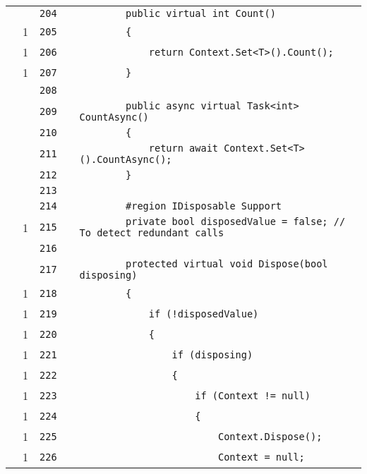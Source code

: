 \documentclass[a4paper,10pt]{article}
\begin{document}
\begin{longtable}[l]{lrrll}
\cellcolor{gray} &  & \verb~204~ & & \verb~        public virtual int Count()~\\
\cellcolor{green} & 1 & \verb~205~ & & \verb~        {~\\
\cellcolor{green} & 1 & \verb~206~ & & \verb~            return Context.Set<T>().Count();~\\
\cellcolor{green} & 1 & \verb~207~ & & \verb~        }~\\
\cellcolor{gray} &  & \verb~208~ & & \verb~~\\
\cellcolor{gray} &  & \verb~209~ & & \verb~        public async virtual Task<int> CountAsync()~\\
\cellcolor{gray} &  & \verb~210~ & & \verb~        {~\\
\cellcolor{gray} &  & \verb~211~ & & \verb~            return await Context.Set<T>().CountAsync();~\\
\cellcolor{gray} &  & \verb~212~ & & \verb~        }~\\
\cellcolor{gray} &  & \verb~213~ & & \verb~~\\
\cellcolor{gray} &  & \verb~214~ & & \verb~        #region IDisposable Support~\\
\cellcolor{green} & 1 & \verb~215~ & & \verb~        private bool disposedValue = false; // To detect redundant calls~\\
\cellcolor{gray} &  & \verb~216~ & & \verb~~\\
\cellcolor{gray} &  & \verb~217~ & & \verb~        protected virtual void Dispose(bool disposing)~\\
\cellcolor{green} & 1 & \verb~218~ & & \verb~        {~\\
\cellcolor{green} & 1 & \verb~219~ & & \verb~            if (!disposedValue)~\\
\cellcolor{green} & 1 & \verb~220~ & & \verb~            {~\\
\cellcolor{green} & 1 & \verb~221~ & & \verb~                if (disposing)~\\
\cellcolor{green} & 1 & \verb~222~ & & \verb~                {~\\
\cellcolor{green} & 1 & \verb~223~ & & \verb~                    if (Context != null)~\\
\cellcolor{green} & 1 & \verb~224~ & & \verb~                    {~\\
\cellcolor{green} & 1 & \verb~225~ & & \verb~                        Context.Dispose();~\\
\cellcolor{green} & 1 & \verb~226~ & & \verb~                        Context = null;~\\

\end{longtable}
\end{document}
